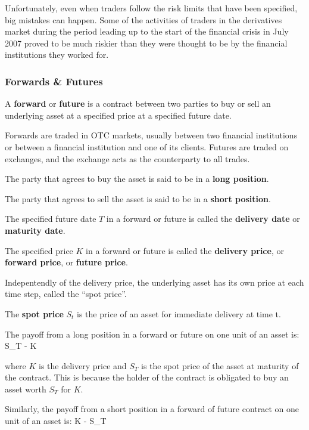 Unfortunately, even when traders follow the risk limits that have been specified, big mistakes can happen. Some of
the activities of traders in the derivatives market during the period leading up to the start of the financial crisis
in July 2007 proved to be much riskier than they were thought to be by the financial institutions they worked for.

\subsubsection{Forwards \& Futures}

A \textbf{forward} or \textbf{future} is a contract between two parties to buy or sell an underlying asset at a
specified price at a specified future date.
\ed

Forwards are traded in OTC markets, usually between two financial institutions or between a financial institution and
one of its clients. Futures are traded on exchanges, and the exchange acts as the counterparty to all trades.

The party that agrees to buy the asset is said to be in a \textbf{long position}.
\ed

The party that agrees to sell the asset is said to be in a \textbf{short position}.
\ed

The specified future date $T$ in a forward or future is called the \textbf{delivery date} or \textbf{maturity date}.
\ed

The specified price $K$ in a forward or future is called the \textbf{delivery price}, or \textbf{forward price}, or
\textbf{future price}.
\ed

Indepentendly of the delivery price, the underlying asset has its own price at each time step, called the ``spot
price''.

The \textbf{spot price} $S_t$ is the price of an asset for immediate delivery at time t.
\ed

The payoff from a long position in a forward or future on one unit of an asset is:
\bse
S_T - K
\ese

where $K$ is the delivery price and $S_T$ is the spot price of the asset at maturity of the contract. This is because
the holder of the contract is obligated to buy an asset worth $S_T$ for $K$.

Similarly, the payoff from a short position in a forward of future contract on one unit of an asset is:
\bse
K - S_T
\ese


